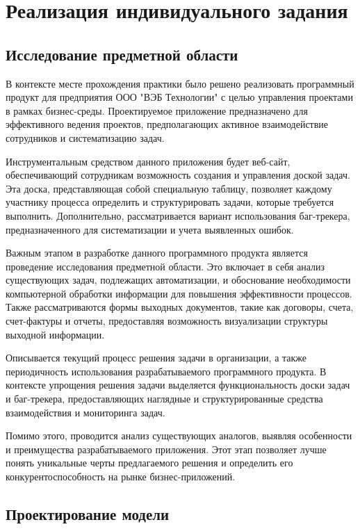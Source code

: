 \documentclass[12pt,a4paper,draft]{belgost/belgost}
\begin{document}
\chapter{Реализация индивидуального задания}

\section{Исследование предметной области}

В контексте месте прохождения практики было решено реализовать программный продукт для предприятия ООО "ВЭБ Технологии" с целью управления проектами в рамках бизнес-среды.
Проектируемое приложение предназначено для эффективного ведения проектов, предполагающих активное взаимодействие сотрудников и систематизацию задач.

Инструментальным средством данного приложения будет веб-сайт, обеспечивающий сотрудникам возможность создания и управления доской задач.
Эта доска, представляющая собой специальную таблицу, позволяет каждому участнику процесса определить и структурировать задачи, которые требуется выполнить.
Дополнительно, рассматривается вариант использования баг-трекера, предназначенного для систематизации и учета выявленных ошибок.

Важным этапом в разработке данного программного продукта является проведение исследования предметной области.
Это включает в себя анализ существующих задач, подлежащих автоматизации, и обоснование необходимости компьютерной обработки информации для повышения эффективности процессов.
Также рассматриваются формы выходных документов, такие как договоры, счета, счет-фактуры и отчеты, предоставляя возможность визуализации структуры выходной информации.

Описывается текущий процесс решения задачи в организации, а также периодичность использования разрабатываемого программного продукта.
В контексте упрощения решения задачи выделяется функциональность доски задач и баг-трекера, предоставляющих наглядные и структурированные средства взаимодействия и мониторинга задач.

Помимо этого, проводится анализ существующих аналогов, выявляя особенности и преимущества разрабатываемого приложения.
Этот этап позволяет лучше понять уникальные черты предлагаемого решения и определить его конкурентоспособность на рынке бизнес-приложений.

\section{Проектирование модели}
\end{document}
